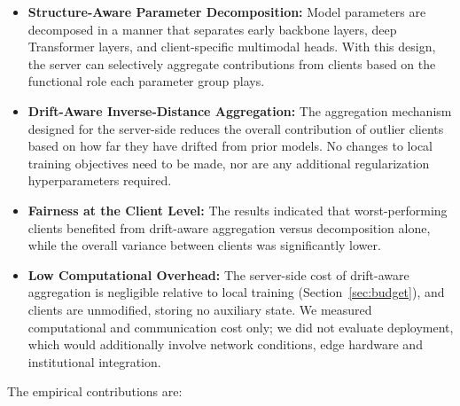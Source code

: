 \documentclass[utf8]{FrontiersinHarvard} %
\begin{document}
\begin{itemize}
    \item \textbf{Structure-Aware Parameter Decomposition:} Model parameters are decomposed in a manner that separates early backbone layers, deep Transformer layers, and client-specific multimodal heads. With this design, the server can selectively aggregate contributions from clients based on the functional role each parameter group plays.

    \item \textbf{Drift-Aware Inverse-Distance Aggregation:} The aggregation mechanism designed for the server-side reduces the overall contribution of outlier clients based on how far they have drifted from prior models. No changes to local training objectives need to be made, nor are any additional regularization hyperparameters required.




    \item \textbf{Fairness at the Client Level:} The results indicated that worst-performing clients benefited from drift-aware aggregation versus decomposition alone, while the overall variance between clients was significantly lower.

    \item \textbf{Low Computational Overhead:} The server-side cost of drift-aware aggregation is negligible relative to local training (Section~\ref{sec:budget}), and clients are unmodified, storing no auxiliary state. We measured computational and communication cost only; we did not evaluate deployment, which would additionally involve network conditions, edge hardware and institutional integration.

\end{itemize}

The empirical contributions are:
\end{document}
